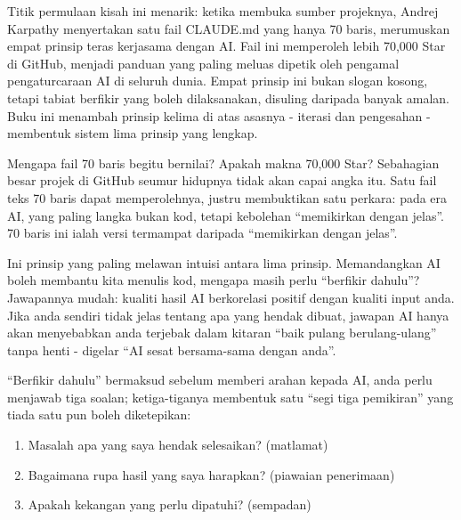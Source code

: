 

Titik permulaan kisah ini menarik: ketika membuka sumber projeknya, Andrej Karpathy menyertakan satu fail CLAUDE.md yang hanya 70 baris, merumuskan empat prinsip teras kerjasama dengan AI. Fail ini memperoleh lebih 70,000 Star di GitHub, menjadi panduan yang paling meluas dipetik oleh pengamal pengaturcaraan AI di seluruh dunia. Empat prinsip ini bukan slogan kosong, tetapi tabiat berfikir yang boleh dilaksanakan, disuling daripada banyak amalan. Buku ini menambah prinsip kelima di atas asasnya - iterasi dan pengesahan - membentuk sistem lima prinsip yang lengkap.

\begin{tcbinfo}{Mengapa fail 70 baris begitu bernilai?}
Apakah makna 70,000 Star? Sebahagian besar projek di GitHub seumur hidupnya tidak akan capai angka itu. Satu fail teks 70 baris dapat memperolehnya, justru membuktikan satu perkara: pada era AI, yang paling langka bukan kod, tetapi kebolehan “memikirkan dengan jelas”. 70 baris ini ialah versi termampat daripada “memikirkan dengan jelas”.

\end{tcbinfo}


Ini prinsip yang paling melawan intuisi antara lima prinsip. Memandangkan AI boleh membantu kita menulis kod, mengapa masih perlu “berfikir dahulu”? Jawapannya mudah: kualiti hasil AI berkorelasi positif dengan kualiti input anda. Jika anda sendiri tidak jelas tentang apa yang hendak dibuat, jawapan AI hanya akan menyebabkan anda terjebak dalam kitaran “baik pulang berulang-ulang” tanpa henti - digelar “AI sesat bersama-sama dengan anda”.

“Berfikir dahulu” bermaksud sebelum memberi arahan kepada AI, anda perlu menjawab tiga soalan; ketiga-tiganya membentuk satu “segi tiga pemikiran” yang tiada satu pun boleh diketepikan:

\begin{enumerate}
  \item Masalah apa yang saya hendak selesaikan? (matlamat)
  \item Bagaimana rupa hasil yang saya harapkan? (piawaian penerimaan)
  \item Apakah kekangan yang perlu dipatuhi? (sempadan)
\end{enumerate}


